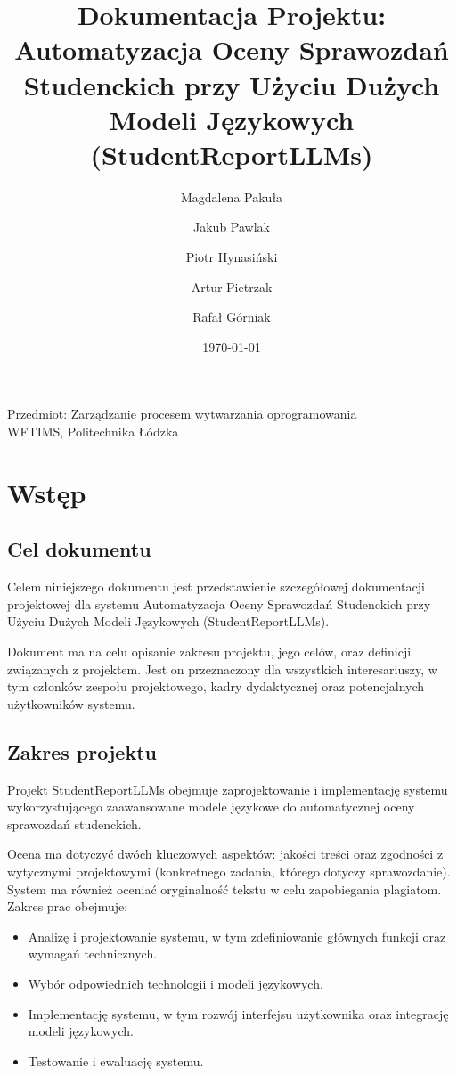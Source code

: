 \documentclass[a4paper, 12pt]{article}
\title{Dokumentacja Projektu: \\ Automatyzacja Oceny Sprawozdań Studenckich przy Użyciu Dużych Modeli Językowych (StudentReportLLMs)}
\author{
    Magdalena Pakuła \and
    Jakub Pawlak \and
    Piotr Hynasiński \and
    Artur Pietrzak \and
    Rafał Górniak
}
\date{\today}
\begin{document}
\maketitle

\vfill
\begin{center}
Przedmiot: Zarządzanie procesem wytwarzania oprogramowania \\
WFTIMS, Politechnika Łódzka
\end{center}

\newpage
\tableofcontents
\newpage

\section{Wstęp}
\subsection{Cel dokumentu}
Celem niniejszego dokumentu jest przedstawienie szczegółowej dokumentacji projektowej dla systemu Automatyzacja Oceny Sprawozdań Studenckich przy Użyciu Dużych Modeli Językowych (StudentReportLLMs).

Dokument ma na celu opisanie zakresu projektu, jego celów, oraz definicji związanych z projektem.
Jest on przeznaczony dla wszystkich interesariuszy, w tym członków zespołu projektowego, kadry dydaktycznej oraz potencjalnych użytkowników systemu.

\subsection{Zakres projektu}
Projekt StudentReportLLMs obejmuje zaprojektowanie i implementację systemu wykorzystującego zaawansowane modele językowe do automatycznej oceny sprawozdań studenckich.

Ocena ma dotyczyć dwóch kluczowych aspektów: jakości treści oraz zgodności z wytycznymi projektowymi (konkretnego zadania, którego dotyczy sprawozdanie).
System ma również oceniać oryginalność tekstu w celu zapobiegania plagiatom.
Zakres prac obejmuje:

\begin{itemize}
    \item Analizę i projektowanie systemu, w tym zdefiniowanie głównych funkcji oraz wymagań technicznych.
    \item Wybór odpowiednich technologii i modeli językowych.
    \item Implementację systemu, w tym rozwój interfejsu użytkownika oraz integrację modeli językowych.
    \item Testowanie i ewaluację systemu.
\end{itemize}
\end{document}
